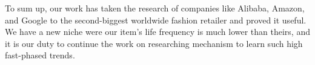 \documentclass{kththesis}
\begin{document}
To sum up, our work has taken the research of companies like Alibaba, Amazon, and Google to the second-biggest worldwide fashion retailer and proved it useful. We have a new niche were our item's life frequency is much lower than theirs, and it is our duty to continue the work on researching mechanism to learn such high fast-phased trends.

\printbibliography
\end{document}
